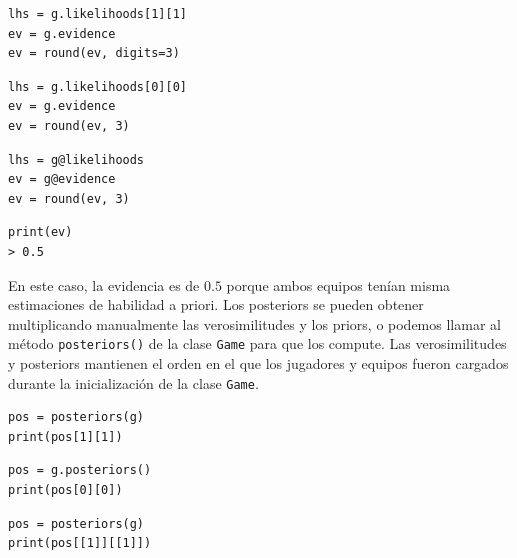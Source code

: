 \documentclass[a4paper,11pt]{book}
\theoremstyle{definition}
\newif\ifen
\newcommand{\en}[1]{\ifen#1\fi}
\begin{document}
%
\begin{paracol}{3}
\begin{lstlisting}[backgroundcolor=\color{julia!60},belowskip=0cm]
lhs = g.likelihoods[1][1]
ev = g.evidence
ev = round(ev, digits=3)
\end{lstlisting}
  \switchcolumn
\begin{lstlisting}[backgroundcolor=\color{python!60},belowskip=0cm]
lhs = g.likelihoods[0][0]
ev = g.evidence
ev = round(ev, 3)
\end{lstlisting}
   \switchcolumn
\begin{lstlisting}[backgroundcolor=\color{r!50},belowskip=0cm]
lhs = g@likelihoods
ev = g@evidence
ev = round(ev, 3)
\end{lstlisting}
\end{paracol}
\begin{lstlisting}[captionpos=b,backgroundcolor=\color{all},label=lst:evidence_likelihoods,caption={Consulta de la evidencia y las verosimilitudes},aboveskip=0cm,belowskip=0cm]
print(ev)
> 0.5
\end{lstlisting}
%
En este caso, la evidencia es de $0.5$ porque ambos equipos tenían misma estimaciones de habilidad a priori.
%
Los posteriors se pueden obtener multiplicando manualmente las verosimilitudes y los priors, o podemos llamar al método \texttt{posteriors()} de la clase \texttt{Game} para que los compute.
%
Las verosimilitudes y posteriors mantienen el orden en el que los jugadores y equipos fueron cargados durante la inicializaci\'on de la clase \texttt{Game}.
%
\begin{paracol}{3}
\begin{lstlisting}[backgroundcolor=\color{julia!60}, belowskip=-0.77 \baselineskip]
pos = posteriors(g)
print(pos[1][1])
\end{lstlisting}
  \switchcolumn
\begin{lstlisting}[backgroundcolor=\color{python!60}, belowskip=-0.77 \baselineskip]
pos = g.posteriors()
print(pos[0][0])
\end{lstlisting}
   \switchcolumn
\begin{lstlisting}[backgroundcolor=\color{r!50}, belowskip=-0.77 \baselineskip]
pos = posteriors(g)
print(pos[[1]][[1]])
\end{lstlisting}
\end{paracol}
\end{document}
